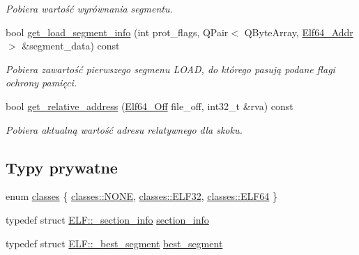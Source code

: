 \begin{DoxyCompactItemize}
\begin{DoxyCompactList}\small\item\em Pobiera wartość wyrównania segmentu. \end{DoxyCompactList}\item 
bool \hyperlink{class_e_l_f_a48849fcd82256a378da6f6cfb4d7001a}{get\-\_\-load\-\_\-segment\-\_\-info} (int prot\-\_\-flags, Q\-Pair$<$ Q\-Byte\-Array, \hyperlink{elf_8h_aeed51d08e3a950d637f8ec1f0cd4ef65}{Elf64\-\_\-\-Addr} $>$ \&segment\-\_\-data) const 
\begin{DoxyCompactList}\small\item\em Pobiera zawartość pierwszego segmenu L\-O\-A\-D, do którego pasują podane flagi ochrony pamięci. \end{DoxyCompactList}\item 
bool \hyperlink{class_e_l_f_a480f02b85a48aa18c1bc1ae23dba2b2f}{get\-\_\-relative\-\_\-address} (\hyperlink{elf_8h_a6f7837bc80df7a68291fce54ff088849}{Elf64\-\_\-\-Off} file\-\_\-off, int32\-\_\-t \&rva) const 
\begin{DoxyCompactList}\small\item\em Pobiera aktualną wartość adresu relatywnego dla skoku. \end{DoxyCompactList}\end{DoxyCompactItemize}
\subsection*{Typy prywatne}
\begin{DoxyCompactItemize}
\item 
enum \hyperlink{class_e_l_f_a8ac9a5a7e999db1f2f11ab21bb31f5f8}{classes} \{ \hyperlink{class_e_l_f_a8ac9a5a7e999db1f2f11ab21bb31f5f8ab50339a10e1de285ac99d4c3990b8693}{classes\-::\-N\-O\-N\-E}, 
\hyperlink{class_e_l_f_a8ac9a5a7e999db1f2f11ab21bb31f5f8acd743c20bf0141c38f02f434409a89e7}{classes\-::\-E\-L\-F32}, 
\hyperlink{class_e_l_f_a8ac9a5a7e999db1f2f11ab21bb31f5f8a523e8094660cc5b0a46e1379cecd4ee0}{classes\-::\-E\-L\-F64}
 \}
\item 
typedef struct \hyperlink{struct_e_l_f_1_1__section__info}{E\-L\-F\-::\-\_\-section\-\_\-info} \hyperlink{class_e_l_f_a453c51d672396e7f5f328153f55e94bc}{section\-\_\-info}
\item 
typedef struct \hyperlink{struct_e_l_f_1_1__best__segment}{E\-L\-F\-::\-\_\-best\-\_\-segment} \hyperlink{class_e_l_f_acc32d4569fb28ff6c041c20870d8c2e7}{best\-\_\-segment}
\end{DoxyCompactItemize}
